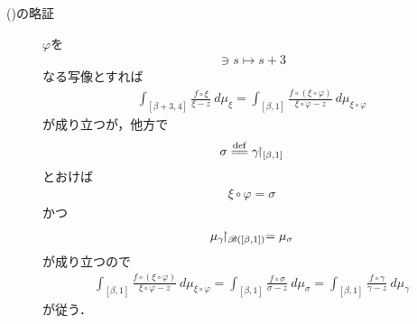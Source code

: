 \begin{description}
		\item[()の略証]
			$\varphi$を
			\begin{align}
				[\beta,1] \ni s \longmapsto s + 3
			\end{align}
			なる写像とすれば
			\begin{align}
				\int_{[\beta+3,4]} \frac{f \circ \xi}{\xi - z}\ d\mu_{\xi}
				= \int_{[\beta,1]} \frac{f \circ (\xi \circ \varphi)}{\xi \circ \varphi - z}\ d\mu_{\xi \circ \varphi}
			\end{align}
			が成り立つが，他方で
			\begin{align}
				\sigma \defeq \gamma \rest_{[\beta,1]}
			\end{align}
			とおけば
			\begin{align}
				\xi \circ \varphi = \sigma
			\end{align}
			かつ
			\begin{align}
				\mu_{\gamma} \hspace{-0.41em}\upharpoonright_{\mathscr{B}([\beta,1])} = \mu_{\sigma}
			\end{align}
			が成り立つので
			\begin{align}
				\int_{[\beta,1]} \frac{f \circ (\xi \circ \varphi)}{\xi \circ \varphi - z}\ d\mu_{\xi \circ \varphi}
				= \int_{[\beta,1]} \frac{f \circ \sigma}{\sigma - z}\ d\mu_{\sigma}
				= \int_{[\beta,1]} \frac{f \circ \gamma}{\gamma - z}\ d\mu_{\gamma}
			\end{align}
			が従う．
	\end{description}